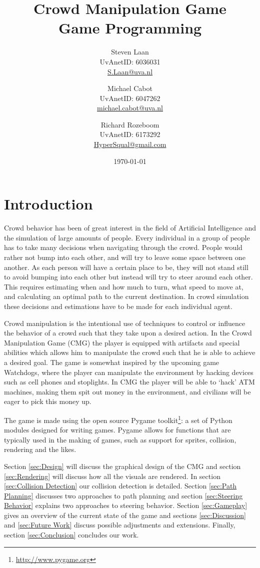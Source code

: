 \documentclass[a4paper,pdf,12pt]{article}
\title{Crowd Manipulation Game\\ \normalsize{Game Programming}}
\author{Steven Laan\\UvAnetID: 6036031\\\url{S.Laan@uva.nl} \and Michael Cabot\\UvAnetID: 6047262\\\url{michael.cabot@uva.nl} \and Richard Rozeboom\\UvAnetID: 6173292\\\url{HyperSqual@gmail.com}}
\date{\today}
\begin{document}
\maketitle

\section{Introduction}
Crowd behavior has been of great interest in the field of Artificial Intelligence and the simulation of large amounts of people. Every individual in a group of people has to take  many decisions when navigating through the crowd. People would rather not bump into each other, and will try to leave some space between one another. As each person will have a certain place to be, they will not stand still to avoid bumping into each other but instead will try to steer around each other. This requires estimating when and how much to turn, what speed to move at, and calculating an optimal path to the current destination. In crowd simulation these decisions and estimations have to be made for each individual agent.

Crowd manipulation is the intentional use of techniques to control or influence the behavior of a crowd such that they take upon a desired action. In the Crowd Manipulation Game (CMG) the player is equipped with artifacts and special abilities which allows him to manipulate the crowd such that he is able to achieve a desired goal. The game is somewhat inspired by the upcoming game Watchdogs\cite{watchdogs}, where the player can manipulate the environment by hacking devices such as cell phones and stoplights. In CMG the player will be able to `hack' ATM machines, making them spit out money in the environment, and civilians will be eager to pick this money up.

The game is made using the open source Pygame toolkit\footnote{\url{http://www.pygame.org}}: a set of Python modules designed for writing games. Pygame allows for functions that are typically used in the making of games, such as support for sprites, collision, rendering and the likes. 

Section \ref{sec:Design} will discuss the graphical design of the CMG and section \ref{sec:Rendering} will discuss how all the visuals are rendered. In section \ref{sec:Collision Detection} our collision detection is detailed. Section \ref{sec:Path Planning} discusses two approaches to path planning and section \ref{sec:Steering Behavior} explains two approaches to steering behavior. Section \ref{sec:Gameplay} gives an overview of the current state of the game and sections \ref{sec:Discussion} and \ref{sec:Future Work} discuss possible adjustments and extensions. Finally, section \ref{sec:Conclusion} concludes our work.
\end{document}
